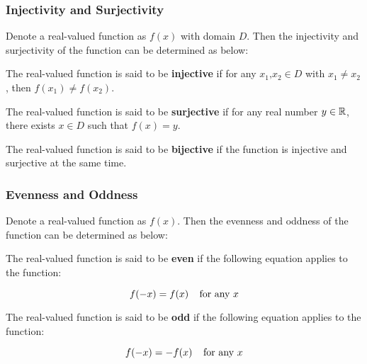 \documentclass[a4paper,12pt]{article}
\begin{document}
\subsubsection{Injectivity and Surjectivity}
\begin{dft}
  Denote a real-valued function as $f(x)$ with domain $D$. Then the injectivity and surjectivity of the function can be determined as below:
  \begin{alist}
    \item The real-valued function is said to be \textbf{injective} if for any $x_{1}\text{,}x_{2}\in D$ with $x_{1}\neq x_{2}$, then $f(x_{1})\neq f(x_{2})$.

    \item The real-valued function is said to be \textbf{surjective} if for any real number $y\in\mathbb{R}$, there exists $x\in D$ such that $f(x)=y$.

    \item The real-valued function is said to be \textbf{bijective} if the function is injective and surjective at the same time.
  \end{alist}
\end{dft}

\subsubsection{Evenness and Oddness}
\begin{dft}
  Denote a real-valued function as $f(x)$. Then the evenness and oddness of the function can be determined as below:
  \begin{alist}
    \item The real-valued function is said to be \textbf{even} if the following equation applies to the function:

    $$f(-x)=f(x)\;\;\;\;\text{for any }x$$

    \item The real-valued function is said to be \textbf{odd} if the following equation applies to the function:

    $$f(-x)=-f(x)\;\;\;\;\text{for any }x$$
  \end{alist}
\end{dft}
\end{document}
